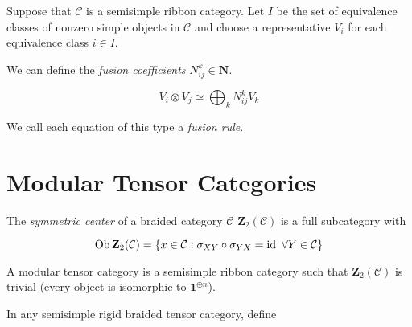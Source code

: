     Suppose that $\mathcal{C}$ is a semisimple ribbon category. Let $I$ be the
    set of equivalence classes of nonzero simple objects in $\mathcal{C}$ and
    choose a representative $V_i$ for each equivalence class  $i \in I$.
    
    We can define the \emph{fusion coefficients} $N_{ij}^k \in \mathbf{N}$.

    \begin{equation}
        V_i \otimes V_j \simeq \bigoplus_k N_{ij}^k V_k
    \end{equation}

    We call each equation of this type a \emph{fusion rule}. 

\section{Modular Tensor Categories}
\label{section:MTCs}




\begin{defn}
    The \emph{symmetric center} of a braided category $\mathcal{C}$
    $\mathbf{Z}_2(\mathcal{C})$ is a full subcategory with 

    \begin{equation}
        \operatorname{Ob} \mathbf{Z}_2(\mathcal{C}) = \left\{ x \in \mathcal{C} : \sigma_{XY} \circ \sigma_{YX} = \operatorname{id}\ \forall Y \in \mathcal{C} \right\}
    \end{equation}


\end{defn}

\begin{defn}
    A modular tensor category is a semisimple ribbon category such that
    $\mathbf{Z}_2(\mathcal{C})$ is trivial (every object is isomorphic to
    $\mathbf{1}^{\oplus n}$). 

\end{defn}


In any semisimple rigid braided tensor category, define

